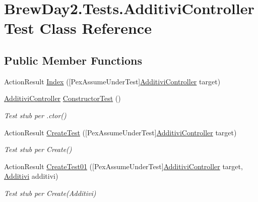 \hypertarget{class_brew_day2_1_1_tests_1_1_additivi_controller_test}{}\section{Brew\+Day2.\+Tests.\+Additivi\+Controller\+Test Class Reference}
\label{class_brew_day2_1_1_tests_1_1_additivi_controller_test}
\subsection*{Public Member Functions}
\begin{DoxyCompactItemize}
\item 
Action\+Result \mbox{\hyperlink{class_brew_day2_1_1_tests_1_1_additivi_controller_test_a58526dd197cdb5d5113c2a84b6687075}{Index}} (\mbox{[}Pex\+Assume\+Under\+Test\mbox{]}\mbox{\hyperlink{class_brew_day2_1_1_controllers_1_1_additivi_controller}{Additivi\+Controller}} target)
\item 
\mbox{\hyperlink{class_brew_day2_1_1_controllers_1_1_additivi_controller}{Additivi\+Controller}} \mbox{\hyperlink{class_brew_day2_1_1_tests_1_1_additivi_controller_test_a90683ef586b3f08ba6ac453f1037d264}{Constructor\+Test}} ()
\begin{DoxyCompactList}\small\item\em Test stub per .ctor()\end{DoxyCompactList}\item 
Action\+Result \mbox{\hyperlink{class_brew_day2_1_1_tests_1_1_additivi_controller_test_a86b0b3f1428fa6e94164963fbdb6ba85}{Create\+Test}} (\mbox{[}Pex\+Assume\+Under\+Test\mbox{]}\mbox{\hyperlink{class_brew_day2_1_1_controllers_1_1_additivi_controller}{Additivi\+Controller}} target)
\begin{DoxyCompactList}\small\item\em Test stub per Create()\end{DoxyCompactList}\item 
Action\+Result \mbox{\hyperlink{class_brew_day2_1_1_tests_1_1_additivi_controller_test_a5b5046262654fe2ad7b602ad7fd40e3e}{Create\+Test01}} (\mbox{[}Pex\+Assume\+Under\+Test\mbox{]}\mbox{\hyperlink{class_brew_day2_1_1_controllers_1_1_additivi_controller}{Additivi\+Controller}} target, \mbox{\hyperlink{class_brew_day2_1_1_models_1_1_additivi}{Additivi}} additivi)
\begin{DoxyCompactList}\small\item\em Test stub per Create(\+Additivi)\end{DoxyCompactList}\item 

\end{DoxyCompactItemize}
